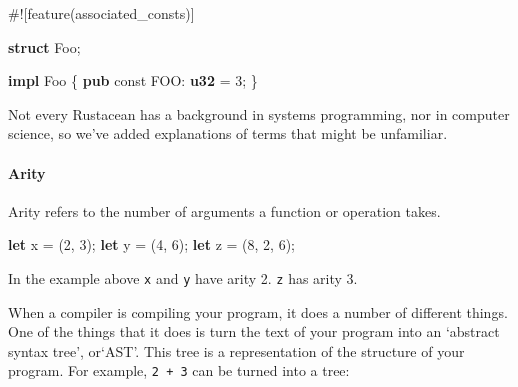 \documentclass[a4paper,]{book}
\newenvironment{Shaded}{\begin{snugshade}}{\end{snugshade}}
\newcommand{\KeywordTok}[1]{\textcolor[rgb]{0.13,0.29,0.53}{\textbf{{#1}}}}
\newcommand{\DecValTok}[1]{\textcolor[rgb]{0.00,0.00,0.81}{{#1}}}
\newcommand{\NormalTok}[1]{{#1}}
\begin{document}
\begin{Shaded}
\begin{Highlighting}[]
\NormalTok{#![feature(associated_consts)]}

\KeywordTok{struct} \NormalTok{Foo;}

\KeywordTok{impl} \NormalTok{Foo \{}
    \KeywordTok{pub} \NormalTok{const FOO: }\KeywordTok{u32} \NormalTok{= }\DecValTok{3}\NormalTok{;}
\NormalTok{\}}
\end{Highlighting}
\end{Shaded}


Not every Rustacean has a background in systems programming, nor in
computer science, so we've added explanations of terms that might be
unfamiliar.

\paragraph{Arity}\label{arity}

Arity refers to the number of arguments a function or operation takes.

\begin{Shaded}
\begin{Highlighting}[]
\KeywordTok{let} \NormalTok{x = (}\DecValTok{2}\NormalTok{, }\DecValTok{3}\NormalTok{);}
\KeywordTok{let} \NormalTok{y = (}\DecValTok{4}\NormalTok{, }\DecValTok{6}\NormalTok{);}
\KeywordTok{let} \NormalTok{z = (}\DecValTok{8}\NormalTok{, }\DecValTok{2}\NormalTok{, }\DecValTok{6}\NormalTok{);}
\end{Highlighting}
\end{Shaded}

In the example above \texttt{x} and \texttt{y} have arity 2. \texttt{z}
has arity 3.


When a compiler is compiling your program, it does a number of different
things. One of the things that it does is turn the text of your program
into an `abstract syntax tree', or`AST'. This tree is a representation
of the structure of your program. For example, \texttt{2\ +\ 3} can be
turned into a tree:
\end{document}
